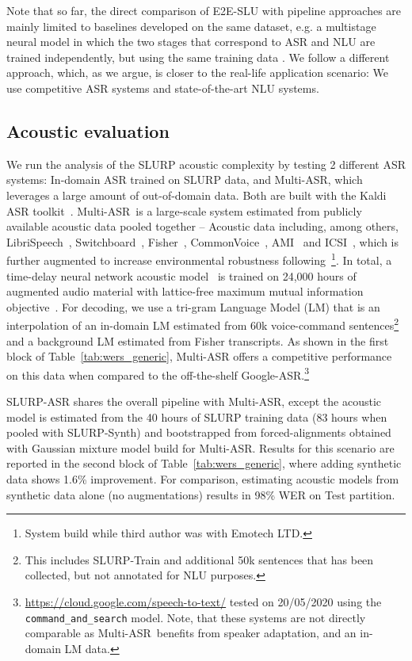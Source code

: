 \documentclass[11pt,a4paper]{article}
\newcommand{\datasetacr}{SLURP}
\newcommand{\etoe}{E2E}
\newcommand{\slu}{SLU}
\newcommand{\asr}{ASR}
\newcommand{\nlu}{NLU}
\newcommand{\wer}{WER}
\newcommand{\masr}{Multi-ASR}
\begin{document}
Note that so far, the direct comparison of \etoe-\slu{} with pipeline approaches are mainly limited to baselines developed on the same dataset, e.g. a multistage neural model in which the two stages that correspond to
\asr{} and \nlu{} are trained independently, but using the same training data \cite{desot:asru2019,Haghani2018:FromAT}. We follow a different approach, which, as we argue, is closer to the real-life application scenario: We use competitive \asr{} systems  and state-of-the-art \nlu{} systems.


\subsection{Acoustic evaluation} \label{sec:asr}
We run the analysis of the \datasetacr{}  acoustic complexity by testing 2 different \asr{} systems:
 In-domain ASR trained on \datasetacr{} data, and \masr{}, which leverages a large amount of out-of-domain data.
  Both are built with the Kaldi \asr{} toolkit~\cite{povey2011kaldi}. 
\masr ~is a large-scale system estimated from publicly available acoustic data pooled together -- Acoustic data including, among others, LibriSpeech~\cite{panayotov2015librispeech}, Switchboard~\cite{Godfrey92:switchboard}, Fisher~\cite{cieri2004fisher}, CommonVoice~\cite{ardila2019common}, AMI~\cite{carletta2007unleashing} and ICSI~\cite{janin2003icsi},
which is further augmented to increase environmental robustness following~\cite{ko2017study}\footnote{System build while third author was with Emotech LTD.}. 
In total, a time-delay neural network acoustic model~\cite{peddinti2015time} is trained on 24,000 hours of augmented audio material with lattice-free maximum mutual information objective~\cite{povey2016purely}. For decoding, we use a tri-gram Language Model (LM) that is an interpolation of an in-domain LM estimated from 60k voice-command sentences\footnote{This includes SLURP-Train and additional 50k sentences that has been collected, but not annotated for \nlu{} purposes.} and a background LM estimated from Fisher transcripts. As shown in the first block of Table~\ref{tab:wers_generic}, \masr{} offers a competitive performance on this data when compared to the off-the-shelf Google-ASR.\footnote{\url{https://cloud.google.com/speech-to-text/} tested on 20/05/2020 using the \texttt{command\_and\_search} model. Note, that these systems are not directly comparable as \masr~benefits from speaker adaptation, and an in-domain LM data.}


\datasetacr-ASR shares the overall pipeline with \masr, except the acoustic model is estimated from the 40 hours of \datasetacr{} training data (83 hours when pooled with \datasetacr-Synth) and bootstrapped from forced-alignments obtained with Gaussian mixture model build for \masr. Results for this scenario are reported in the second block of Table~\ref{tab:wers_generic}, where adding synthetic data shows 1.6\% improvement. For comparison, estimating acoustic models from synthetic data alone (no augmentations) results in 98\% \wer{} on Test partition. 
\end{document}
